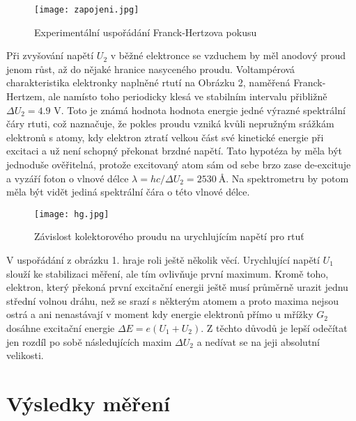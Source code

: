 \documentclass[a4paper,11pt]{article}
\begin{document}
\begin{figure}[htpb]
    \centering
    \texttt{[image: zapojeni.jpg]}
    \caption{Experimentální uspořádání Franck-Hertzova pokusu}
\end{figure}


Při zvyšování napětí $ U_2 $ v běžné elektronce se vzduchem by měl anodový proud jenom růst, až do nějaké hranice nasyceného proudu. Voltampérová charakteristika elektronky naplněné rtutí na Obrázku 2, naměřená Franck-Hertzem, ale namísto toho periodicky klesá ve stabilním intervalu přibližně $ \Delta U_2 = 4.9 $ V. Toto je známá hodnota hodnota energie jedné výrazné spektrální čáry rtuti, což naznačuje, že pokles proudu vzniká kvůli nepružným srážkám elektronů s atomy, kdy elektron ztratí velkou část své kinetické energie při excitaci a už není schopný překonat brzdné napětí. Tato hypotéza by měla být jednoduše ověřitelná, protože excitovaný atom sám od sebe brzo zase de-excituje a vyzáří foton o vlnové délce $ \lambda = hc / \Delta U_2 = 2530 \ \si{\angstrom}$. Na spektrometru by potom měla být vidět jediná spektrální čára o této vlnové délce. 


\begin{figure}[htpb]
    \centering
    \texttt{[image: hg.jpg]}
    \caption{Závislost kolektorového proudu na urychlujícím napětí pro rtuť}
\end{figure}

V uspořádání z obrázku 1. hraje roli ještě několik věcí. Urychlující napětí $ U_1 $ slouží ke stabilizaci měření, ale tím ovlivňuje první maximum. Kromě toho, elektron, který překoná první excitační energii ještě musí průměrně urazit jednu střední volnou dráhu, než se srazí s některým atomem a proto maxima nejsou ostrá a ani nenastávají v moment kdy energie elektronů přímo u mřížky $ G_2 $ dosáhne excitační energie $ \Delta E = e( U_1 + U_2 )$. Z těchto důvodů je lepší odečítat jen rozdíl po sobě následujících maxim $ \Delta U_2 $ a nedívat se na jeji absolutní velikosti. 

\section{Výsledky měření}
\end{document}
